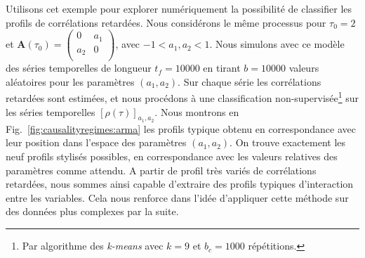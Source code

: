 Utilisons cet exemple pour explorer numériquement la possibilité de classifier les profils de corrélations retardées. Nous considérons le même processus pour $\tau_0 = 2$ et $\mathbf{A}(\tau_0) = \left( {\begin{array}{cc} 0 & a_1 \\ a_2 & 0 \\ \end{array}} \right)$, avec $-1<a_1,a_2<1$. Nous simulons avec ce modèle des séries temporelles de longueur $t_f=10000$ en tirant $b=10000$ valeurs aléatoires pour les paramètres $(a_1,a_2)$. Sur chaque série les corrélations retardées sont estimées, et nous procédons à une classification non-supervisée\footnote{Par algorithme des \emph{k-means} avec $k=9$ et $b_c = 1000$ répétitions.} sur les séries temporelles $\left[\rho(\tau)\right]_{a_1,a_2}$. Nous montrons en Fig.~\ref{fig:causalityregimes:arma} les profils typique obtenu en correspondance avec leur position dans l'espace des paramètres $(a_1,a_2)$. On trouve exactement les neuf profils stylisés possibles, en correspondance avec les valeurs relatives des paramètres comme attendu. A partir de profil très variés de corrélations retardées, nous sommes ainsi capable d'extraire des profils typiques d'interaction entre les variables. Cela nous renforce dans l'idée d'appliquer cette méthode sur des données plus complexes par la suite.



